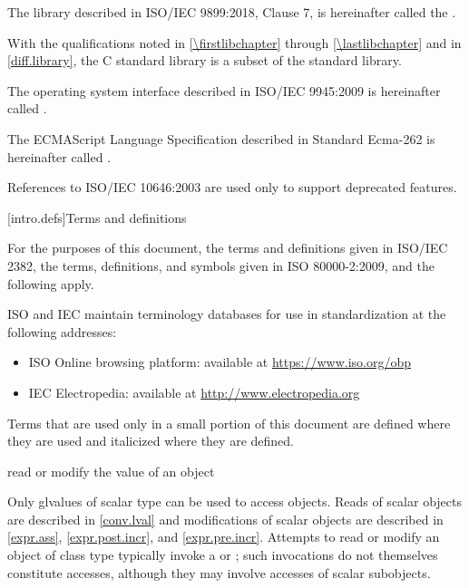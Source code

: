 \pnum
The library described in ISO/IEC 9899:2018, Clause 7,
is hereinafter called the
.
\begin{footnote}
With the qualifications noted in \ref{\firstlibchapter}
through \ref{\lastlibchapter} and in \ref{diff.library}, the C standard
library is a subset of the \Cpp{} standard library.
\end{footnote}

\pnum
The operating system interface described in ISO/IEC 9945:2009 is
hereinafter called .

\pnum
The ECMAScript Language Specification described in Standard Ecma-262 is
hereinafter called .

\pnum
\begin{note}
References to ISO/IEC 10646:2003 are used only
to support deprecated features.
\end{note}

[intro.defs]{Terms and definitions}

\pnum
{}%
For the purposes of this document,
the terms and definitions
given in ISO/IEC 2382,
the terms, definitions, and symbols
given in ISO 80000-2:2009,
and the following apply.

\pnum
ISO and IEC maintain terminology databases
for use in standardization
at the following addresses:
\begin{itemize}
\item ISO Online browsing platform: available at \url{https://www.iso.org/obp}
\item IEC Electropedia: available at \url{http://www.electropedia.org}
\end{itemize}

\pnum
Terms that are used only in a small portion of this document
are defined where they are used and italicized where they are
defined.

%
read or modify the value of an object

\begin{defnote}
Only glvalues of scalar type can be used to access objects.
Reads of scalar objects are described in \ref{conv.lval} and
modifications of scalar objects are described in
\ref{expr.ass}, \ref{expr.post.incr}, and \ref{expr.pre.incr}.
Attempts to read or modify an object of class type
typically invoke a 
or ;
such invocations do not themselves constitute accesses,
although they may involve accesses of scalar subobjects.
\end{defnote}

